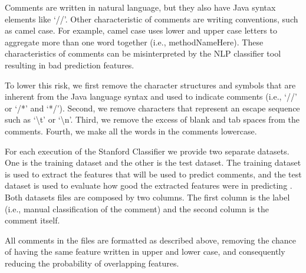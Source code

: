 Comments are written in natural language, but they also have Java syntax elements like `//'. Other characteristic of comments are writing conventions, such as camel case. For example, camel case uses lower and upper case letters to aggregate more than one word together (i.e., methodNameHere). These characteristics of comments can be misinterpreted by the NLP classifier tool resulting in bad prediction features. 

To lower this risk, we first remove the character structures and symbols that are inherent from the Java language syntax and used to indicate comments (i.e., `//' or `/*' and `*/'). Second, we remove characters that represent an escape sequence such as `\textbackslash t' or `\textbackslash n'. Third, we remove the excess of blank and tab spaces from the comments. Fourth, we make all the words in the comments lowercase.

For each execution of the Stanford Classifier we provide two separate datasets. One is the training dataset and the other is the test dataset. The training dataset is used to extract the features that will be used to predict \SATD comments, and the test dataset is used to evaluate how good the extracted features were in predicting \SATD. Both datasets files are composed by two columns. The first column is the label (i.e., manual classification of the comment) and the second column is the comment itself.

All comments in the files are formatted as described above, removing the chance of having the same feature written in upper and lower case, and consequently reducing the probability of overlapping features. 

